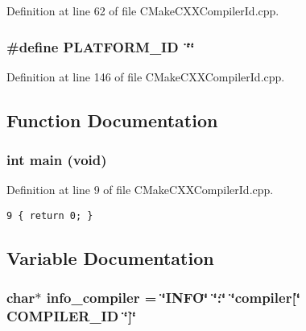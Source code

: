 Definition at line 62 of file CMakeCXXCompilerId.cpp.
\subsubsection{\setlength{\rightskip}{0pt plus 5cm}\#define PLATFORM\_\-ID~\char`\"{}\char`\"{}}\label{CMakeCXXCompilerId_8cpp_dbc5372f40838899018fadbc89bd588b}




Definition at line 146 of file CMakeCXXCompilerId.cpp.

\subsection{Function Documentation}
\subsubsection{\setlength{\rightskip}{0pt plus 5cm}int main (void)}\label{CMakeCXXCompilerId_8cpp_e66f6b31b5ad750f1fe042a706a4e3d4}




Definition at line 9 of file CMakeCXXCompilerId.cpp.

\begin{Code}\begin{verbatim}9 { return 0; }
\end{verbatim}
\end{Code}




\subsection{Variable Documentation}
\subsubsection{\setlength{\rightskip}{0pt plus 5cm}char$\ast$ {\bf info\_\-compiler} = \char`\"{}INFO\char`\"{} \char`\"{}:\char`\"{} \char`\"{}compiler[\char`\"{} COMPILER\_\-ID \char`\"{}]\char`\"{}}\label{CMakeCXXCompilerId_8cpp_ab4f0400f2b990cc0cfaa596066ed23a}




